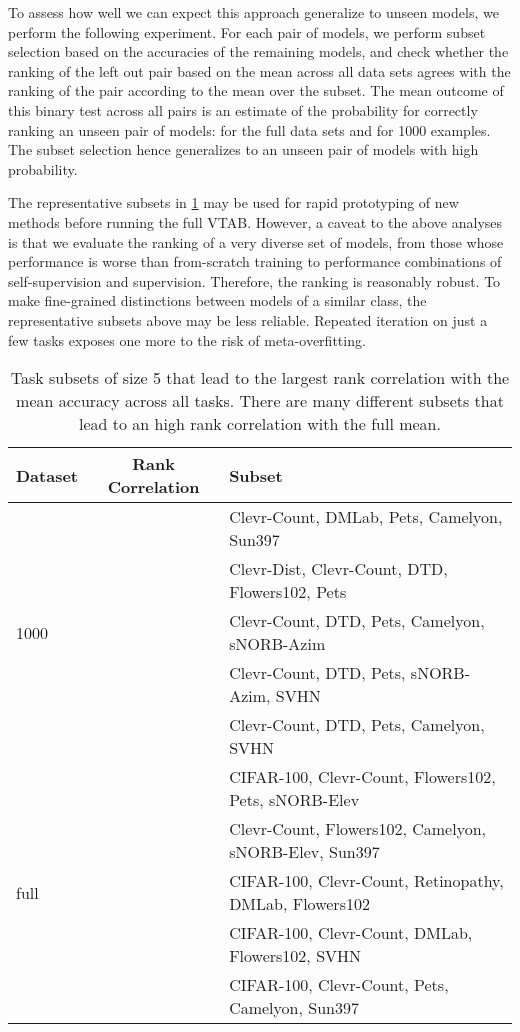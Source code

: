 \documentclass{article}
\begin{document}
To assess how well we can expect this approach generalize to unseen models, we perform the following experiment. For each pair of models, we perform subset selection based on the accuracies of the remaining models, and check whether the ranking of the left out pair based on the mean across all data sets agrees with the ranking of the pair according to the mean over the subset. The mean outcome of this binary test across all pairs is an estimate of the probability for correctly ranking an unseen pair of models:  for the full data sets and  for 1000 examples. The subset selection hence generalizes to an unseen pair of models with high probability.

The representative subsets in \cref{tab:subsetrank} may be used for rapid prototyping of new methods before running the full VTAB.
However, a caveat to the above analyses is that we evaluate the ranking of a very diverse set of models, from those whose performance is worse than from-scratch training to performance combinations of self-supervision and supervision.
Therefore, the ranking is reasonably robust.
To make fine-grained distinctions between models of a similar class, the representative subsets above may be less reliable.
Repeated iteration on just a few tasks exposes one more to the risk of meta-overfitting.

\begin{table}[h]
\begin{center}
\begin{tabular}{lcl}
\toprule
\bf Dataset & \bf Rank Correlation & \bf Subset \\
\toprule
\multirow{5}{*}{1000}
 &  & Clevr-Count, DMLab, Pets, Camelyon, Sun397 \\
 &  & Clevr-Dist, Clevr-Count, DTD, Flowers102, Pets \\
 &  & Clevr-Count, DTD, Pets, Camelyon, sNORB-Azim \\
 &  & Clevr-Count, DTD, Pets, sNORB-Azim, SVHN \\
 &  & Clevr-Count, DTD, Pets, Camelyon, SVHN \\
\midrule
\multirow{5}{*}{full}
 &  & CIFAR-100, Clevr-Count, Flowers102, Pets, sNORB-Elev \\
 &  & Clevr-Count, Flowers102, Camelyon, sNORB-Elev, Sun397 \\
 &  & CIFAR-100, Clevr-Count, Retinopathy, DMLab, Flowers102 \\
 &  & CIFAR-100, Clevr-Count, DMLab, Flowers102, SVHN \\
 &  & CIFAR-100, Clevr-Count, Pets, Camelyon, Sun397 \\
\bottomrule
\end{tabular}
 \caption{\label{tab:subsetrank} Task subsets of size 5 that lead to the largest rank correlation with the mean accuracy across all tasks. There are many different subsets that lead to an high rank correlation with the full mean.}
\end{center}
\end{table}
\end{document}

